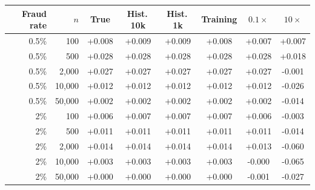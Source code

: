 \begin{tabular}{rrcccccc}\toprule
Fraud rate & $n$ & True & Hist.\,10k & Hist.\,1k & Training & $0.1\times$ & $10\times$\\\midrule
0.5\% & 100 & +0.008 & +0.009 & +0.009 & +0.008 & +0.007 & +0.007\\
0.5\% & 500 & +0.028 & +0.028 & +0.028 & +0.028 & +0.028 & +0.018\\
0.5\% & 2,000 & +0.027 & +0.027 & +0.027 & +0.027 & +0.027 & -0.001\\
0.5\% & 10,000 & +0.012 & +0.012 & +0.012 & +0.012 & +0.012 & -0.026\\
0.5\% & 50,000 & +0.002 & +0.002 & +0.002 & +0.002 & +0.002 & -0.014\\
2\% & 100 & +0.006 & +0.007 & +0.007 & +0.007 & +0.006 & -0.003\\
2\% & 500 & +0.011 & +0.011 & +0.011 & +0.011 & +0.011 & -0.014\\
2\% & 2,000 & +0.014 & +0.014 & +0.014 & +0.014 & +0.013 & -0.060\\
2\% & 10,000 & +0.003 & +0.003 & +0.003 & +0.003 & -0.000 & -0.065\\
2\% & 50,000 & +0.000 & +0.000 & +0.000 & +0.000 & -0.001 & -0.027\\
\bottomrule\end{tabular}